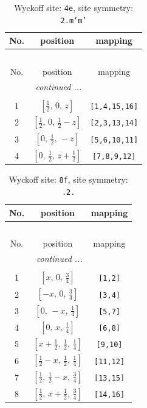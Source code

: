 \documentclass[fleqn,8pt]{jsarticle}
\begin{document}
\renewcommand{\arraystretch}{1.2}
\begin{longtable}{ccc}
\caption{Wyckoff site: {\tt 4e}, site symmetry: {\tt 2.m'm'}}
 \\
 \hline \hline
No. & position & mapping \\ \hline \endfirsthead

\multicolumn{2}{l}{\tablename\ \thetable{}} \\
 \hline \hline
No. & position & mapping \\ \hline \endhead

 \hline \hline
\multicolumn{2}{r}{\footnotesize\it continued ...} \\ \endfoot

 \hline \hline
\multicolumn{2}{r}{} \\ \endlastfoot

1 & $\left[ \frac{1}{2},\, 0,\, z \right]$ & {\tt [1,4,15,16]} \\ \hline
2 & $\left[ \frac{1}{2},\, 0,\, \frac{1}{2} - z \right]$ & {\tt [2,3,13,14]} \\ \hline
3 & $\left[ 0,\, \frac{1}{2},\, - z \right]$ & {\tt [5,6,10,11]} \\ \hline
4 & $\left[ 0,\, \frac{1}{2},\, z + \frac{1}{2} \right]$ & {\tt [7,8,9,12]} \\
\end{longtable}
\renewcommand{\arraystretch}{1.2}
\begin{longtable}{ccc}
\caption{Wyckoff site: {\tt 8f}, site symmetry: {\tt .2.}}
 \\
 \hline \hline
No. & position & mapping \\ \hline \endfirsthead

\multicolumn{2}{l}{\tablename\ \thetable{}} \\
 \hline \hline
No. & position & mapping \\ \hline \endhead

 \hline \hline
\multicolumn{2}{r}{\footnotesize\it continued ...} \\ \endfoot

 \hline \hline
\multicolumn{2}{r}{} \\ \endlastfoot

1 & $\left[ x,\, 0,\, \frac{3}{4} \right]$ & {\tt [1,2]} \\ \hline
2 & $\left[ - x,\, 0,\, \frac{3}{4} \right]$ & {\tt [3,4]} \\ \hline
3 & $\left[ 0,\, - x,\, \frac{1}{4} \right]$ & {\tt [5,7]} \\ \hline
4 & $\left[ 0,\, x,\, \frac{1}{4} \right]$ & {\tt [6,8]} \\ \hline
5 & $\left[ x + \frac{1}{2},\, \frac{1}{2},\, \frac{1}{4} \right]$ & {\tt [9,10]} \\ \hline
6 & $\left[ \frac{1}{2} - x,\, \frac{1}{2},\, \frac{1}{4} \right]$ & {\tt [11,12]} \\ \hline
7 & $\left[ \frac{1}{2},\, \frac{1}{2} - x,\, \frac{3}{4} \right]$ & {\tt [13,15]} \\ \hline
8 & $\left[ \frac{1}{2},\, x + \frac{1}{2},\, \frac{3}{4} \right]$ & {\tt [14,16]} \\
\end{longtable}
\end{document}
